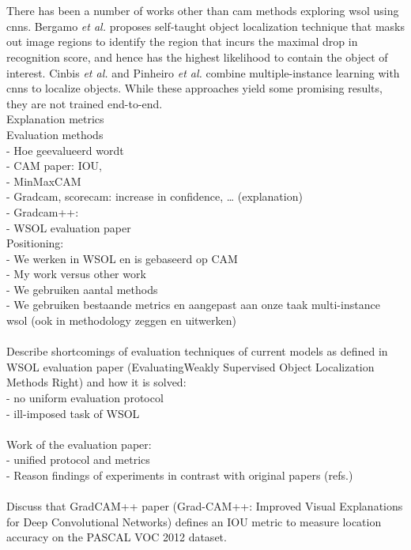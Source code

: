 \\\\
There has been a number of works other than \acrshort{cam} methods exploring \acrfull{wsol} using \acrshort{cnn}s. Bergamo \textit{et al.} \cite{bazzani2016self} proposes self-taught object localization technique that masks out image regions to identify the region that incurs the maximal drop in recognition score, and hence has the highest likelihood to contain the object of interest. Cinbis \textit{et al.} \cite{cinbis2016weakly} and Pinheiro \textit{et al.} \cite{pinheiro2015image} combine multiple-instance learning with \acrshort{cnn}s to localize objects. While these approaches yield some promising results, they are not trained end-to-end.
\\
Explanation metrics \\
Evaluation methods \\
- Hoe geevalueerd wordt \\
- CAM paper: IOU,\\
- MinMaxCAM\\
- Gradcam, scorecam: increase in confidence, … (explanation) \\
- Gradcam++: \\
- WSOL evaluation paper\\
Positioning:\\
- We werken in WSOL en is gebaseerd op CAM\\
- My work versus other work\\
- We gebruiken aantal methods\\
- We gebruiken bestaande metrics en aangepast aan onze taak multi-instance wsol (ook in methodology zeggen en uitwerken)\\
\\
Describe shortcomings of evaluation techniques of current models as defined in WSOL evaluation paper (EvaluatingWeakly Supervised Object Localization Methods Right) and how it is solved:\\
- no uniform evaluation protocol\\
- ill-imposed task of WSOL\\
\\
Work of the evaluation paper:\\ 
- unified protocol and metrics \\
- Reason findings of experiments in contrast with original papers (refs.)\\
\\
Discuss that GradCAM++ paper (Grad-CAM++: Improved Visual Explanations for Deep Convolutional Networks) defines an IOU metric to measure location accuracy on the PASCAL VOC 2012 dataset.
